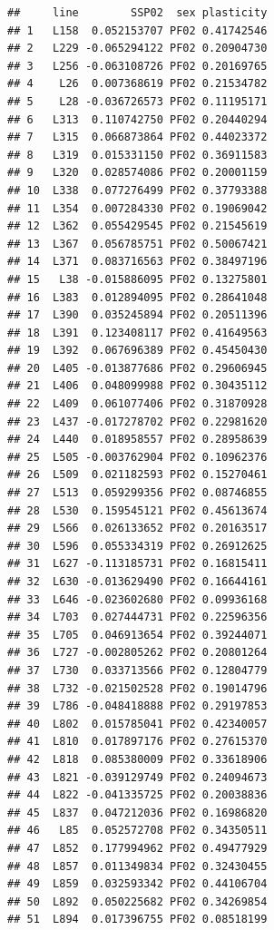 \documentclass[
]{article}
\newenvironment{Shaded}{\begin{snugshade}}{\end{snugshade}}
\newcommand{\KeywordTok}[1]{\textcolor[rgb]{0.13,0.29,0.53}{\textbf{#1}}}
\newcommand{\NormalTok}[1]{#1}
\newcommand{\OperatorTok}[1]{\textcolor[rgb]{0.81,0.36,0.00}{\textbf{#1}}}
\newcommand{\StringTok}[1]{\textcolor[rgb]{0.31,0.60,0.02}{#1}}
\begin{document}
\begin{Shaded}
\end{Shaded}

\begin{verbatim}
##     line        SSP02  sex plasticity
## 1   L158  0.052153707 PF02 0.41742546
## 2   L229 -0.065294122 PF02 0.20904730
## 3   L256 -0.063108726 PF02 0.20169765
## 4    L26  0.007368619 PF02 0.21534782
## 5    L28 -0.036726573 PF02 0.11195171
## 6   L313  0.110742750 PF02 0.20440294
## 7   L315  0.066873864 PF02 0.44023372
## 8   L319  0.015331150 PF02 0.36911583
## 9   L320  0.028574086 PF02 0.20001159
## 10  L338  0.077276499 PF02 0.37793388
## 11  L354  0.007284330 PF02 0.19069042
## 12  L362  0.055429545 PF02 0.21545619
## 13  L367  0.056785751 PF02 0.50067421
## 14  L371  0.083716563 PF02 0.38497196
## 15   L38 -0.015886095 PF02 0.13275801
## 16  L383  0.012894095 PF02 0.28641048
## 17  L390  0.035245894 PF02 0.20511396
## 18  L391  0.123408117 PF02 0.41649563
## 19  L392  0.067696389 PF02 0.45450430
## 20  L405 -0.013877686 PF02 0.29606945
## 21  L406  0.048099988 PF02 0.30435112
## 22  L409  0.061077406 PF02 0.31870928
## 23  L437 -0.017278702 PF02 0.22981620
## 24  L440  0.018958557 PF02 0.28958639
## 25  L505 -0.003762904 PF02 0.10962376
## 26  L509  0.021182593 PF02 0.15270461
## 27  L513  0.059299356 PF02 0.08746855
## 28  L530  0.159545121 PF02 0.45613674
## 29  L566  0.026133652 PF02 0.20163517
## 30  L596  0.055334319 PF02 0.26912625
## 31  L627 -0.113185731 PF02 0.16815411
## 32  L630 -0.013629490 PF02 0.16644161
## 33  L646 -0.023602680 PF02 0.09936168
## 34  L703  0.027444731 PF02 0.22596356
## 35  L705  0.046913654 PF02 0.39244071
## 36  L727 -0.002805262 PF02 0.20801264
## 37  L730  0.033713566 PF02 0.12804779
## 38  L732 -0.021502528 PF02 0.19014796
## 39  L786 -0.048418888 PF02 0.29197853
## 40  L802  0.015785041 PF02 0.42340057
## 41  L810  0.017897176 PF02 0.27615370
## 42  L818  0.085380009 PF02 0.33618906
## 43  L821 -0.039129749 PF02 0.24094673
## 44  L822 -0.041335725 PF02 0.20038836
## 45  L837  0.047212036 PF02 0.16986820
## 46   L85  0.052572708 PF02 0.34350511
## 47  L852  0.177994962 PF02 0.49477929
## 48  L857  0.011349834 PF02 0.32430455
## 49  L859  0.032593342 PF02 0.44106704
## 50  L892  0.050225682 PF02 0.34269854
## 51  L894  0.017396755 PF02 0.08518199

\end{verbatim}
\end{document}
